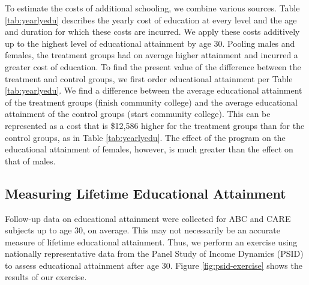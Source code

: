 \noindent To estimate the costs of additional schooling, we combine various sources. Table \ref{tab:yearlyedu}   describes the yearly cost of education at every level and the age and duration for which these costs are incurred. We apply these costs additively up to the highest level of educational attainment by age 30. Pooling males and females, the treatment groups had on average higher attainment and incurred a greater cost of education. To find the present value of the difference between the treatment and control groups, we first order educational attainment per Table \ref{tab:yearlyedu}. We find a difference between the average educational attainment of the treatment groups (finish community college) and the average educational attainment of the control groups (start community college). This can be represented as a cost that is \$12,586 higher for the treatment groups than for the control groups, as in Table \ref{tab:yearlyedu}. The effect of the program on the educational attainment of females, however, is much greater than the effect on that of males.

\subsection{Measuring Lifetime Educational Attainment}

\noindent Follow-up data on educational attainment were collected for ABC and CARE subjects up to age 30, on average. This may not necessarily be an accurate measure of lifetime educational attainment. Thus, we perform an exercise using nationally representative data from the Panel Study of Income Dynamics (PSID) to assess educational attainment after age 30. Figure \ref{fig:psid-exercise} shows the results of our exercise. \\

